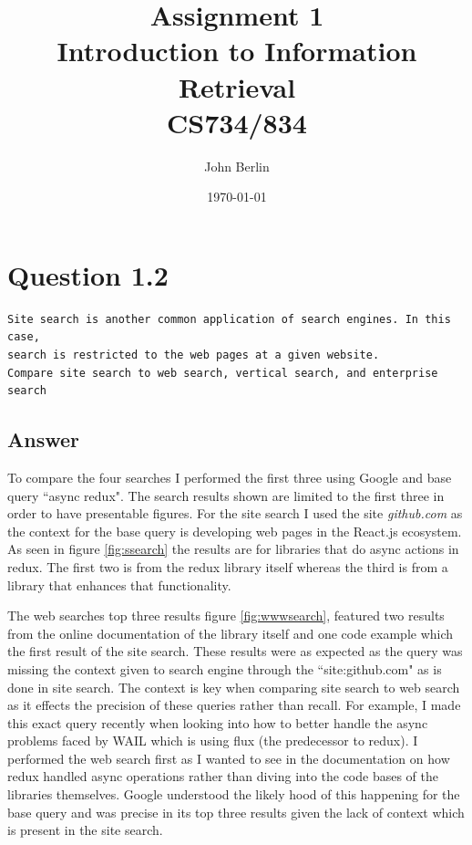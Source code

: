 \documentclass[11pt]{article}
\title{Assignment 1 \\ Introduction to Information Retrieval \\ CS734/834}
\author{John Berlin}
\date{\today}
\begin{document}
\maketitle
\newpage
\section{Question 1.2}
\begin{verbatim}
Site search is another common application of search engines. In this case,
search is restricted to the web pages at a given website. 
Compare site search to web search, vertical search, and enterprise search
\end{verbatim}
\subsection{Answer}
To compare the four searches I performed the first three using Google and base query ``async redux". 
The search results shown are limited to the first three in order to have presentable figures.
For the site search I used the site \textit{github.com} as the context for the base query is developing web pages in the React.js ecosystem.
As seen in figure \hyperref[fig:ssearch]{\ref{fig:ssearch}} the results are for libraries that do async actions in redux. The first two is from the redux library itself whereas the third is from a library that enhances that functionality.  \newline

The web searches top three results figure \hyperref[fig:wwwearch]{\ref{fig:wwwsearch}}, featured two results from the online documentation of the library itself and one code example which the first result of the site search.  These results were as expected as the query was missing the context given to search engine through the ``site:github.com" as is done in site search. The context is key when comparing site search to web search as it effects the precision of these queries rather than recall. For example, I made this exact query recently when looking into how to better handle the async problems faced by WAIL\footnotemark {} which is using flux (the predecessor to redux). I performed the web search first as I wanted to see in the documentation on how redux handled async operations rather than diving into the code bases of the libraries themselves. Google understood the likely hood of this happening for the base query and was precise in its top three results given the lack of context which is present in the site search.
\newline 
\end{document}
